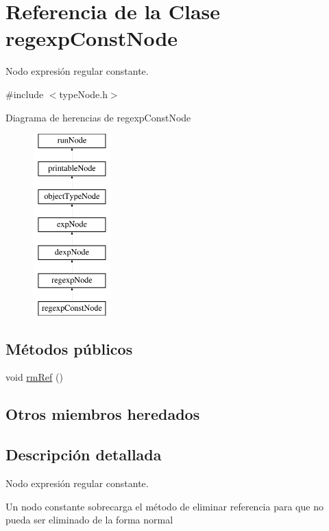 \hypertarget{classregexpConstNode}{\section{Referencia de la Clase regexp\-Const\-Node}
\label{classregexpConstNode}
}


Nodo expresión regular constante.  




{\ttfamily \#include $<$type\-Node.\-h$>$}

Diagrama de herencias de regexp\-Const\-Node\begin{figure}[H]
\begin{center}
\leavevmode
\includegraphics[height=7.000000cm]{classregexpConstNode}
\end{center}
\end{figure}
\subsection*{Métodos públicos}
\begin{DoxyCompactItemize}
\item 
void \hyperlink{classregexpConstNode_ae8383ec5adf0ff93cf29e0818e83eac3}{rm\-Ref} ()
\end{DoxyCompactItemize}
\subsection*{Otros miembros heredados}


\subsection{Descripción detallada}
Nodo expresión regular constante. 

Un nodo constante sobrecarga el método de eliminar referencia para que no pueda ser eliminado de la forma normal 

